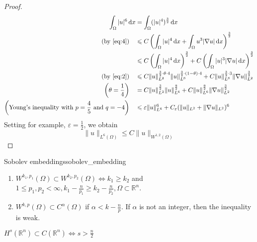 \documentclass{report}
\begin{document}
\begin{proof}
    \begin{align*}
        \int_{\Omega} \vert u \vert^{6} \,\mathrm{d}x &= \int_{\Omega} (\vert u \vert^{4})^{\frac{3}{2}} \,\mathrm{d}x \\
        (\text{by \eqref{eq:4}}) \quad &\leq C \left(\int_{\Omega} \vert u \vert^{4} \,\mathrm{d}x + \int_{\Omega} u^{3}|\nabla u| \,\mathrm{d}x \right)^{\frac{3}{2}} \\
        &\leq C \left(\int_{\Omega} \vert u \vert^{4} \,\mathrm{d}x\right)^{\frac{3}{2}} + C \left(\int_{\Omega} \vert u \vert^{3} \vert \nabla u \vert \,\mathrm{d}x \right)^{\frac{3}{2}} \\
        (\text{by \eqref{eq:2}}) \quad &\leq C \|u\|^{\frac{3}{2}\cdot \theta \cdot 4}_{L^{2}} \|u\|^{\frac{3}{2}\cdot (1-\theta) \cdot 4}_{L^{6}} + C \|u\|^{\frac{3}{2}\cdot 3}_{L^{6}} \|\nabla u\|^{\frac{3}{2}}_{L^{2}} \\
        \left(\theta = \frac{1}{4}\right) \quad &= C \|u\|^{\frac{3}{2}}_{L^{2}} \|u\|^{\frac{9}{2}}_{L^{6}} + C\|u\|^{\frac{9}{2}}_{L^{6}} \|\nabla u\|^{\frac{3}{2}}_{L^{2}} \\
        \left(\text{Young's inequality with } p=\frac{4}{5} \text{ and }q=-4\right) \quad &\leq \varepsilon \|u\|^{6}_{L^{6}} + C_{\varepsilon}(\|u\|_{L^{2}} + \|\nabla u\|_{L^{2}})^{6}
    \end{align*}
    Setting for example, \(\varepsilon = \frac{1}{2}\), we obtain
    \[\|u\|_{L^{6}(\Omega)} \leq C \|u\|_{W^{1, 2}(\Omega)}\]
\end{proof}

\begin{theorem}{Sobolev embeddings}{sobolev_embedding}
    \begin{enumerate}[label=\bfseries\tiny\protect\circled{\small\arabic*}]
		\item \(W^{k_1, p_1}(\Omega) \subset W^{k_2, p_2}(\Omega) \Longleftrightarrow k_1 \geq k_2\) and \(1 \leq p_1, p_2 < \infty, k_1 - \frac{n}{p_1} \geq k_2 - \frac{n}{p_2}, \Omega \subset \mathbb{R}^{n}\).
		\item \(W^{k,p}(\Omega) \subset C^{\alpha}(\Omega)\) if \(\alpha < k - \frac{n}{p}\). If \(\alpha\) is not an integer, then the inequality is weak.
	\end{enumerate}
\end{theorem}

\begin{example}{}{}
    \(H^{s}(\mathbb{R}^{n}) \subset C(\mathbb{R}^{n}) \iff s > \frac{n}{2}\) 
\end{example}
\end{document}
